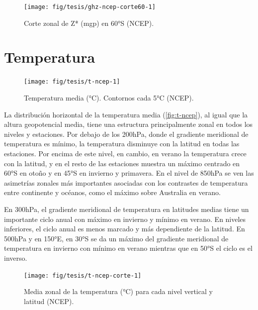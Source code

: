 \documentclass[spanish,a4paper,12pt,oneside]{book}
\begin{document}
\begin{figure}
\texttt{[image: fig/tesis/ghz-ncep-corte60-1]} \caption{Corte zonal de Z* (mgp) en 60°S (NCEP).}\label{fig:ghz-ncep-corte60}
\end{figure}

\section{Temperatura}\label{temperatura}

\begin{landscape}\begin{figure}

{\centering \texttt{[image: fig/tesis/t-ncep-1]} 

}

\caption{Temperatura media (°C). Contornos cada 5°C (NCEP).}\label{fig:t-ncep}
\end{figure}
\end{landscape}

La distribución horizontal de la temperatura media
(\autoref{fig:t-ncep}), al igual que la altura geopotencial media, tiene
una estructura principalmente zonal en todos los niveles y estaciones.
Por debajo de los 200hPa, donde el gradiente meridional de temperatura
es mínimo, la temperatura disminuye con la latitud en todas las
estaciones. Por encima de este nivel, en cambio, en verano la
temperatura crece con la latitud, y en el resto de las estaciones
muestra un máximo centrado en 60°S en otoño y en 45°S en invierno y
primavera. En el nivel de 850hPa se ven las asimetrías zonales más
importantes asociadas con los contrastes de temperatura entre continente
y océanos, como el máximo sobre Australia en verano.

En 300hPa, el gradiente meridional de temperatura en latitudes medias
tiene un importante ciclo anual con máximo en invierno y mínimo en
verano. En niveles inferiores, el ciclo anual es menos marcado y más
dependiente de la latitud. En 500hPa y en 150°E, en 30°S se da un máximo
del gradiente meridional de temperatura en invierno con mínimo en verano
mientras que en 50°S el ciclo es el inverso.

\begin{figure}
\texttt{[image: fig/tesis/t-ncep-corte-1]} \caption{Media zonal de la temperatura (°C) para cada nivel vertical y latitud (NCEP).}\label{fig:t-ncep-corte}
\end{figure}
\end{document}
